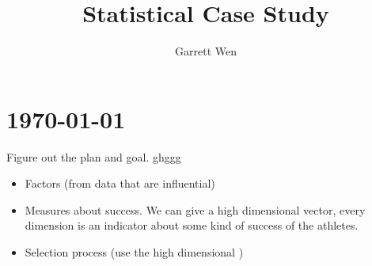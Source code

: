 \documentclass[11pt]{article}
\title{Statistical Case Study}
\author{Garrett Wen}
\begin{document}
\maketitle
\tableofcontents
\section{\today}

Figure out the plan and goal. 
ghggg

\begin{itemize}
	\item Factors (from data that are influential)
	\item Measures about success.
	We can give a high dimensional vector, every dimension is an indicator about some kind of success of the athletes. 
	\item Selection process (use the high dimensional )
\end{itemize}


\end{document}
